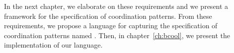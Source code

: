 In the next chapter, we elaborate on these requirements and we present a framework for the specification of coordination patterns. From these requirements, we propose a language for capturing the specification of coordination patterns named \bcool. Then, in chapter~\ref{ch:bcool}, we present the implementation of our language.









